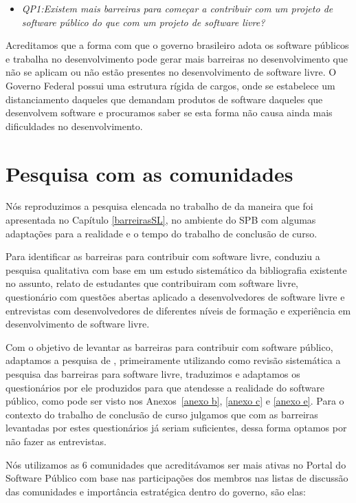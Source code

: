 \begin{itemize}
\item \emph{QP1:Existem mais barreiras para começar a contribuir 
com um projeto de software público do que com um projeto de software livre?}

\end{itemize}

Acreditamos que a forma com que o governo brasileiro adota os software públicos
e trabalha no desenvolvimento pode gerar mais barreiras no desenvolvimento que 
não se aplicam ou não estão presentes no desenvolvimento de software livre. O
Governo Federal possui uma estrutura rígida de cargos, onde se estabelece um
distanciamento daqueles que demandam produtos de software daqueles que desenvolvem
software e procuramos saber se esta forma não causa ainda mais dificuldades no 
desenvolvimento.

\section{Pesquisa com as comunidades}

Nós reproduzimos a pesquisa elencada no trabalho de  
da maneira que foi apresentada no Capítulo \ref{barreirasSL}, no ambiente
do SPB com algumas adaptações para a realidade e o tempo do trabalho de conclusão
de curso.

Para identificar as barreiras para contribuir com software livre,  conduziu a 
pesquisa qualitativa com base em um estudo sistemático da bibliografia existente no
assunto, relato de estudantes que contribuiram com software livre, questionário com 
questões abertas aplicado a desenvolvedores de software livre e entrevistas com 
desenvolvedores de diferentes níveis de formação e experiência em desenvolvimento
de software livre.
 
Com o objetivo de levantar as barreiras para contribuir com software público, adaptamos
a pesquisa de , primeiramente utilizando como revisão sistemática a pesquisa 
das barreiras para software livre, traduzimos e adaptamos os questionários
por ele produzidos para que atendesse a realidade do software público, como pode ser 
visto nos Anexos~\ref{anexo b}, \ref{anexo c} e \ref{anexo e}. Para o contexto do 
trabalho de conclusão de curso julgamos que com as barreiras levantadas por estes 
questionários já seriam suficientes, dessa forma optamos por não fazer as entrevistas.

Nós utilizamos as 6 comunidades que acreditávamos ser mais ativas
no Portal do Software Público com base nas participações dos membros nas listas de 
discussão das comunidades e importância estratégica dentro do governo, são elas:

